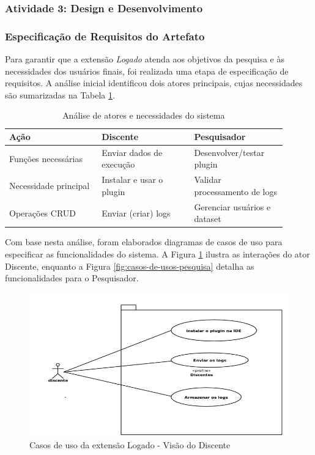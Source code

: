 \subsubsection{Atividade 3: Design e Desenvolvimento}
\label{subsubsec:design-desenvolvimento}

\subsubsection{Especificação de Requisitos do Artefato}
\label{subsubsec:requisitos}

Para garantir que a extensão \textit{Logado} atenda aos objetivos da pesquisa e às necessidades dos usuários finais, foi realizada uma etapa de especificação de requisitos. A análise inicial identificou dois atores principais, cujas necessidades são sumarizadas na Tabela \ref{tab:analise-atores}.

\begin{table}[h!]
\centering
\caption{Análise de atores e necessidades do sistema}
\label{tab:analise-atores}
\begin{tabular}{|p{0.3\linewidth}|p{0.3\linewidth}|p{0.3\linewidth}|}
\hline
\textbf{Ação} & \textbf{Discente} & \textbf{Pesquisador} \\
\hline
Funções necessárias & Enviar dados de execução & Desenvolver/testar plugin \\
\hline
Necessidade principal & Instalar e usar o plugin & Validar processamento de logs \\
\hline
Operações CRUD & Enviar (criar) logs & Gerenciar usuários e dataset \\
\hline
\end{tabular}
\end{table}

Com base nesta análise, foram elaborados diagramas de casos de uso para especificar as funcionalidades do sistema. A Figura \ref{fig:casos-uso-discente} ilustra as interações do ator Discente, enquanto a Figura \ref{fig:casos-de-usos-pesquisa} detalha as funcionalidades para o Pesquisador.
\begin{figure}[H]
    \centering
    \includegraphics[width=1.1\textwidth]{../figuras/caso-de-uso-discentes.png}
    \caption{Casos de uso da extensão Logado - Visão do Discente}
    \label{fig:casos-uso-discente}
\end{figure}

